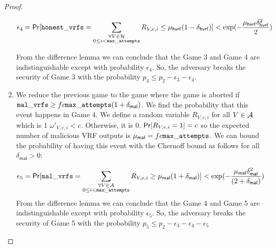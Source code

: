 \begin{proof}
\begin{enumerate}[label={{Game }}{{\arabic*}}]
	\begin{equation}\label{eq:beforeepcoh}
	\epsilon_4 = \mathsf{Pr}[ \mathtt{honest\_vrfs} = \sum_{\substack{ \forall V \in \mathcal{H} \\0\leq i < \mathtt{max\_attempts}}} R_{V,e,i} \leq \mu_{\mathsf{hvrf}} (1 - \delta_{\mathsf{hvrf}})] < \exp(-\frac{\mu_{\mathsf{hvrf}}\delta_{\mathsf{hvrf}}^2}{2}) \nonumber
	\end{equation}
	
	From the difference lemma we can conclude that the Game 3 and Game 4 are indistinguishable except with probability $ \epsilon_4 $. So, the adversary breaks the security of Game 3 with the probability $ p_4 \leq p_2 - \epsilon_3  - \epsilon_4$.       
	
	\item We reduce the previous game to the game where the game is aborted if $ \mathtt{mal\_vrfs} \geq fc \mathtt{max\_attempts} (1+\delta_{\mathsf{mal}}) $. We find the probability that this event happens in Game 4.
	We define a random variable $ R_{V,e,i} $ for all $ V \in \mathcal{A} $ which is 1 $ \omega'_{V,e,i} < c $. Otherwise, it is 0.  $ \mathsf{Pr}[R_{V,e,i} = 1] = c $ so the expected number of malicious VRF outputs  is $ \mu_{\mathsf{mal}} = fc\mathtt{max\_attempts}  $. We can bound the probability of having this event with the Chernoff bound as follows for all $ \delta_{\mathsf{mal}} > 0 	 $:
	
	\begin{equation}\label{eq:malvrf}
	\epsilon_5 = \mathsf{Pr}[ \mathtt{mal\_vrfs} = \sum_{\substack{ \forall V \in \mathcal{A} \\0\leq i < \mathtt{max\_attempts}}} R_{V,e,i} \geq \mu_{\mathsf{mal}} (1+ \delta_{\mathsf{mal}})] < \exp(-\frac{\mu_{\mathsf{mal}}\delta_{\mathsf{mal}}^2}{(2+\delta_{\mathsf{mal}})}) \nonumber
	\end{equation}                                                                                                                                                                                                          From the difference lemma we can conclude that the Game 4 and Game 5 are indistinguishable except with probability $ \epsilon_5 $. So, the adversary breaks the security of Game 5 with the probability $ p_5 \leq p_2 - \epsilon_3  - \epsilon_4 - \epsilon_5$                                                         
	

	
	

\end{enumerate}
\end{proof}
